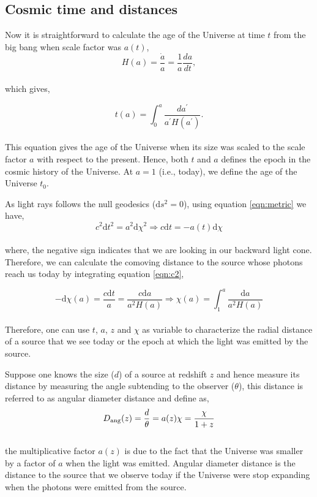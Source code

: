 \subsection{Cosmic time and distances}


Now it is straightforward to calculate the age of the Universe at time $t$ from the big bang
when scale factor was $a(t)$,
\begin{equation}
	H(a) = \dfrac{\dot{a}}{a} = \dfrac{1}{a} \dfrac{da}{dt},
\end{equation}
\\
which gives,

\begin{equation}
	t(a) = \int_0^a \dfrac{da^{\prime}}{a^{\prime}H(a^{\prime})}.
\end{equation}
\\
This equation gives the age of the Universe when its size was
scaled to the scale factor $a$ with respect to the present. Hence, both $t$ and
$a$ defines the epoch in the cosmic history of the Universe. At $a=1$ (i.e., today),
we define the age of the Universe $t_0$.

As light rays follows the null geodesics ($\mathrm{d}s^2=0$), using equation 
\ref{eqn:metric} we have,
\begin{equation}
	c^2\mathrm{d}t^2 = a^2\mathrm{d}\chi^2 \Rightarrow c\mathrm{d}t = -a(t)\mathrm{d}\chi
	\label{eqn:c2}
\end{equation}
\\
where, the negative sign indicates that we are looking in our backward light cone. 
Therefore, we can calculate the comoving distance to the source whose photons reach us
today by integrating equation \ref{eqn:c2},

\begin{equation}
	-\mathrm{d}\chi(a) = \dfrac{c\mathrm{d}t}{a} = 
	 \dfrac{c\mathrm{d}a}{a^2 H(a)}
	 \Rightarrow \chi(a) = \int_1^a \dfrac{\mathrm{d}a}{a^2H(a)}
\end{equation}
\\
Therefore, one can use $t$, $a$, $z$ and $\chi$ as variable to characterize the
radial distance of a source that we see today or the epoch at which the light was
emitted by the source. 

Suppose one knows the size ($d$) of a source at redshift $z$ and hence measure its
distance by measuring the angle subtending to the observer ($\theta$), this distance is referred
to as angular diameter distance and define as,
\begin{equation}
	D_{\rm ang}(z) = \dfrac{d}{\theta} = a(z)\chi = \dfrac{\chi}{1+z}
\end{equation}
\\
the multiplicative factor $a(z)$ is due to the fact that the Universe was smaller by 
a factor of $a$ when the light was emitted.  Angular diameter distance 
is the distance to the source that we observe today if the Universe were
stop expanding when the photons were emitted from the source.

